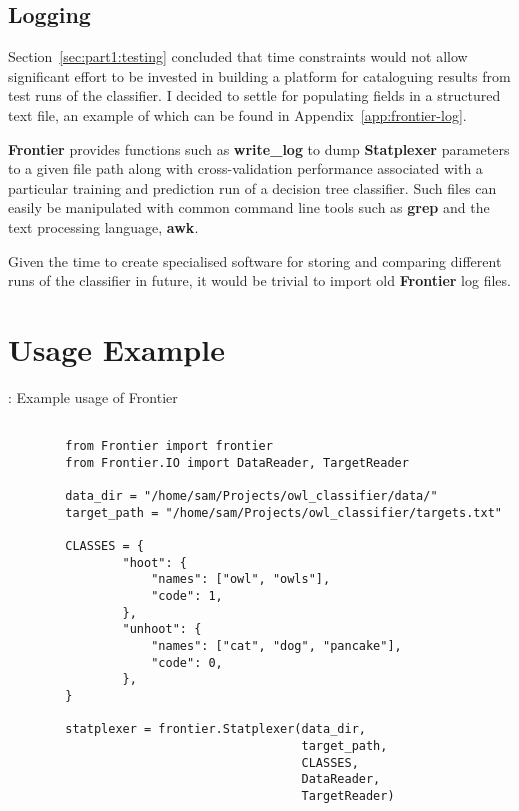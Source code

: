 \subsection{Logging}

Section~\ref{sec:part1:testing} concluded that time constraints would not allow
significant effort to be invested in building a platform for cataloguing results
from test runs of the classifier. I decided to settle for populating fields in a
structured text file, an example of which can be found in
Appendix~\ref{app:frontier-log}.

\textbf{Frontier} provides functions such as \textbf{write\_log} to dump
\textbf{Statplexer} parameters to a given file path along with cross-validation
performance associated with a particular training and prediction run of a
decision tree classifier. Such files can easily be manipulated with common
command line tools such as \textbf{grep} and the text processing language,
\textbf{awk}.

Given the time to create specialised software for storing and comparing
different runs of the classifier in future, it would be trivial to import old
\textbf{Frontier} log files.


\section{Usage Example}

\begin{listing}[H]
    \caption[callstatplexer]{: Example usage of Frontier}
    \label{list:callstatplexer}
    \begin{verbatim}

        from Frontier import frontier
        from Frontier.IO import DataReader, TargetReader

        data_dir = "/home/sam/Projects/owl_classifier/data/"
        target_path = "/home/sam/Projects/owl_classifier/targets.txt"

        CLASSES = {
                "hoot": {
                    "names": ["owl", "owls"],
                    "code": 1,
                },
                "unhoot": {
                    "names": ["cat", "dog", "pancake"],
                    "code": 0,
                },
        }

        statplexer = frontier.Statplexer(data_dir,
                                         target_path,
                                         CLASSES,
                                         DataReader,
                                         TargetReader)
    \end{verbatim}
\end{listing}

